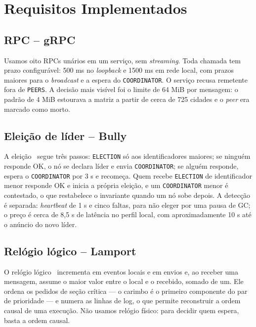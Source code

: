 \section{Requisitos Implementados}

\subsection{RPC -- gRPC}

Usamos oito RPCs unários em um serviço, sem \textit{streaming}. Toda chamada tem prazo
configurável: 500 ms no \textit{loopback} e 1500 ms em rede local, com prazos maiores para o
\textit{broadcast} e a espera do \texttt{COORDINATOR}. O serviço recusa remetente fora de
\texttt{PEERS}. A decisão mais visível foi o limite de 64 MiB por mensagem: o padrão de 4 MiB
estourava a matriz a partir de cerca de 725 cidades e o \textit{peer} era marcado como morto.

\subsection{Elei\c{c}\~ao de l\'ider -- Bully}

A eleição~\cite{garcia82} segue três passos: \texttt{ELECTION} só aos identificadores maiores; se
ninguém responde OK, o nó se declara líder e envia \texttt{COORDINATOR}; se alguém responde, espera
o \texttt{COORDINATOR} por 3 s e recomeça. Quem recebe \texttt{ELECTION} de identificador menor
responde OK e inicia a própria eleição, e um \texttt{COORDINATOR} menor é contestado, o que
restabelece o invariante quando um nó sobe depois. A detecção é separada: \textit{heartbeat} de 1 s
e cinco faltas, para não eleger por uma pausa de GC; o preço é cerca de 8,5 s de latência no perfil
local, com aproximadamente 10 s até o anúncio do novo líder.

\subsection{Rel\'ogio l\'ogico -- Lamport}

O relógio lógico~\cite{lamport78} incrementa em eventos locais e em envios e, ao receber uma
mensagem, assume o maior valor entre o local e o recebido, somado de um. Ele ordena os pedidos de
seção crítica --- o carimbo é o primeiro componente do par de prioridade --- e numera as linhas de
log, o que permite reconstruir a ordem causal de uma execução. Não usamos relógio físico: para
decidir quem espera, basta a ordem causal.

